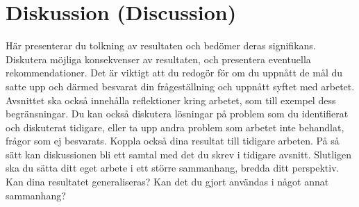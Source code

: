 \section{Diskussion (Discussion)}

Här presenterar du tolkning av resultaten och bedömer deras signifikans. Diskutera möjliga konsekvenser av resultaten, och presentera eventuella rekommendationer. Det är viktigt att du redogör för om du uppnått de mål du satte upp och därmed besvarat din frågeställning och uppnått syftet med arbetet. Avsnittet ska också innehålla reflektioner kring arbetet, som till exempel dess begränsningar.  Du kan också diskutera lösningar på problem som du identifierat och diskuterat tidigare, eller ta upp andra problem som arbetet inte behandlat, frågor som ej besvarats. Koppla också dina resultat till tidigare arbeten. På så sätt kan diskussionen bli ett samtal med det du skrev i tidigare avsnitt.  Slutligen ska du sätta ditt eget arbete i ett större sammanhang, bredda ditt perspektiv. Kan dina resultatet generaliseras? Kan det du gjort användas i något annat sammanhang? 
